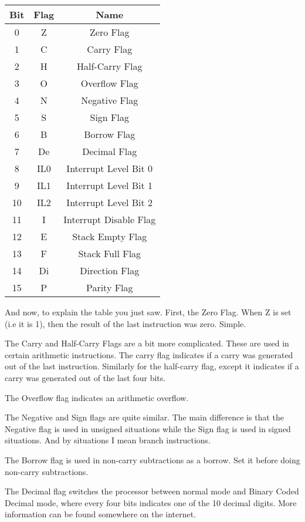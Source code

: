 \documentclass[letterpaper,12pt]{book}
\begin{document}
\begin{tabular}{|c|c|c|}
\hline
	Bit & Flag & Name\\
\hline
	0 & Z & Zero Flag\\
	1 & C & Carry Flag\\
	2 & H & Half-Carry Flag\\
	3 & O & Overflow Flag\\
	4 & N & Negative Flag\\
	5 & S & Sign Flag\\
	6 & B & Borrow Flag\\
	7 & De & Decimal Flag\\
	8 & IL0 & Interrupt Level Bit 0\\
	9 & IL1 & Interrupt Level Bit 1\\
	10 & IL2 & Interrupt Level Bit 2\\
	11 & I & Interrupt Disable Flag\\
	12 & E & Stack Empty Flag\\
	13 & F & Stack Full Flag\\
	14 & Di & Direction Flag\\
	15 & P & Parity Flag\\
\hline
\end{tabular}

And now, to explain the table you just saw. First, the Zero Flag. When Z is set (i.e it is 1), then the result of the last instruction was zero. Simple.

The Carry and Half-Carry Flags are a bit more complicated. These are used in certain arithmetic instructions. The carry flag indicates if a carry was generated out of the last instruction. Similarly for the half-carry flag, except it indicates if a carry was generated out of the last four bits.

The Overflow flag indicates an arithmetic overflow.

The Negative and Sign flags are quite similar. The main difference is that the Negative flag is used in unsigned situations while the Sign flag is used in signed situations. And by situations I mean branch instructions.

The Borrow flag is used in non-carry subtractions as a borrow. Set it before doing non-carry subtractions.

The Decimal flag switches the processor between normal mode and Binary Coded Decimal mode, where every four bits indicates one of the 10 decimal digits. More information can be found somewhere on the internet.
\end{document}
